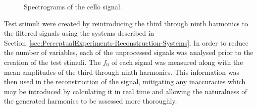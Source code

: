 			\begin{figure}[h!]
				\centering
				\quad
				\caption{Spectrograms of the cello signal.}
				\label{fig:CelloSpectrograms}
			\end{figure}

			Test stimuli were created by reintroducing the third through ninth harmonics to the filtered
			signals using the systems described in
			Section~\ref{sec:PerceptualExperiments-Reconstruction-Systems}. In order to reduce the number of
			variables, each of the unprocessed signals was analysed prior to the creation of the test stimuli.
			The $f_{0}$ of each signal was measured along with the mean amplitudes of the third through ninth
			harmonics.  This information was then used in the reconstruction of the signal, mitigating any
			inaccuracies which may be introduced by calculating it in real time and allowing the naturalness of
			the generated harmonics to be assessed more thoroughly.

